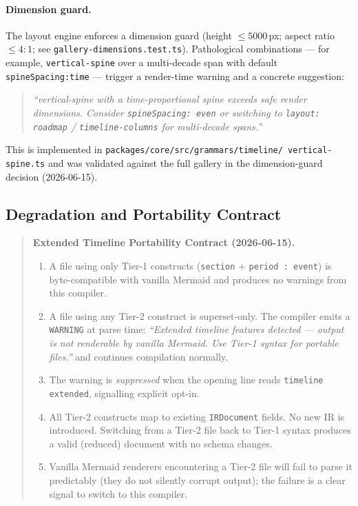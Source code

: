 \paragraph{Dimension guard.}
The layout engine enforces a dimension guard (height $\le 5000$\,px; aspect
ratio $\le 4:1$; see \texttt{gallery-dimensions.test.ts}).  Pathological
combinations --- for example, \texttt{vertical-spine} over a multi-decade
span with default \texttt{spineSpacing:time} --- trigger a render-time
warning and a concrete suggestion:

\begin{quote}
\textit{``vertical-spine with a time-proportional spine exceeds safe render
dimensions.  Consider \texttt{spineSpacing: even} or switching to
\texttt{layout: roadmap} / \texttt{timeline-columns} for multi-decade
spans.''}
\end{quote}

This is implemented in \texttt{packages/core/src/grammars/timeline/\allowbreak
vertical-spine.ts} and was validated against the full gallery in the
dimension-guard decision (2026-06-15).

\subsection{Degradation and Portability Contract}
\label{sec:et-degradation}

\begin{quote}
\textbf{Extended Timeline Portability Contract (2026-06-15).}

\begin{enumerate}
  \item A file using only Tier-1 constructs (\texttt{section} +
        \texttt{period : event}) is byte-compatible with vanilla Mermaid and
        produces no warnings from this compiler.
  \item A file using any Tier-2 construct is superset-only.  The compiler
        emits a \texttt{WARNING} at parse time:
        \textit{``Extended timeline features detected --- output is not
        renderable by vanilla Mermaid.  Use Tier-1 syntax for portable
        files.''} and continues compilation normally.
  \item The warning is \emph{suppressed} when the opening line reads
        \texttt{timeline extended}, signalling explicit opt-in.
  \item All Tier-2 constructs map to existing \texttt{IRDocument} fields.
        No new IR is introduced.  Switching from a Tier-2 file back to
        Tier-1 syntax produces a valid (reduced) document with no schema
        changes.
  \item Vanilla Mermaid renderers encountering a Tier-2 file will fail to
        parse it predictably (they do not silently corrupt output); the
        failure is a clear signal to switch to this compiler.
\end{enumerate}
\end{quote}

